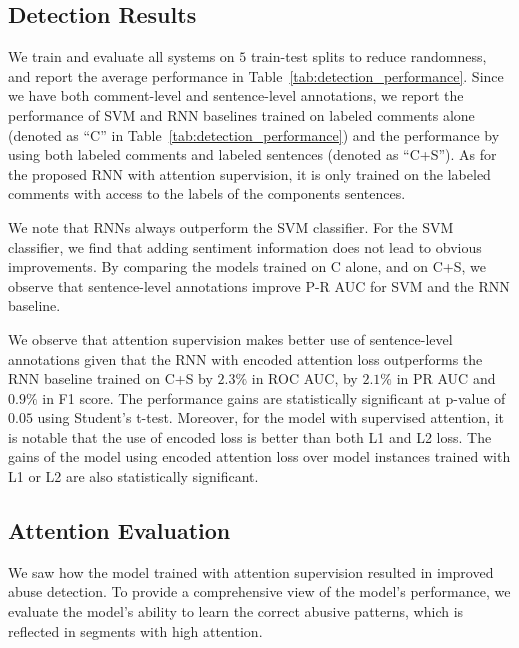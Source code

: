 \documentclass[letterpaper]{article} %
\begin{document}
\subsection{Detection Results} We train and evaluate all systems on $5$ train-test splits to reduce randomness, and report
the average performance  in Table~\ref{tab:detection_performance}. Since we have both comment-level and sentence-level annotations, {we report the performance of SVM and RNN baselines trained on labeled comments alone (denoted as ``C'' in Table~\ref{tab:detection_performance}) and the performance by using both labeled comments and labeled sentences (denoted as ``C+S'').} As for the proposed RNN with attention supervision, it is only trained on the labeled comments with access to the labels of the components sentences.

We note that RNNs always outperform the SVM classifier.
For the SVM classifier, we find that adding sentiment information does not lead to obvious improvements. By comparing the models trained on C alone, and on C+S, we observe that sentence-level annotations improve P-R AUC for SVM and the RNN baseline.

We observe that  attention supervision  makes better use of sentence-level annotations given that the RNN with encoded attention loss outperforms the RNN baseline trained on C+S by $2.3\%$ in ROC AUC, by $2.1\%$ in PR AUC and $0.9\%$ in F1 score. The performance gains are statistically significant at p-value of $0.05$ using Student's t-test.  Moreover, for the model with supervised attention, it is notable that the use of encoded loss is better than both L1 and L2 loss. The gains of the model using encoded attention loss over model instances trained with L1 or L2 are also statistically significant.

\subsection{Attention Evaluation}
We saw how the model trained with attention supervision resulted in improved abuse detection.
To provide a comprehensive view of the model's performance,   we evaluate the model's  ability to learn the correct abusive patterns, which is reflected in segments with high attention.
\end{document}
